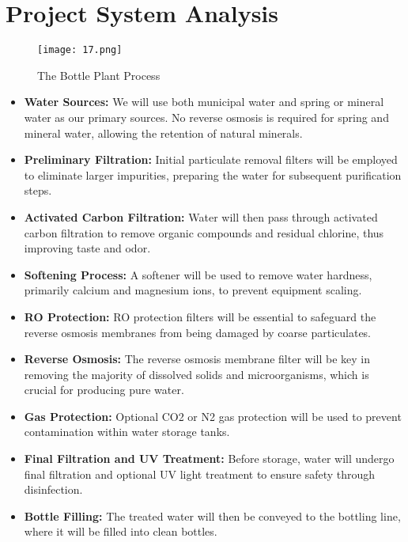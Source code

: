 \documentclass{article}
\begin{document}
\section{Project System Analysis}

\begin{figure}[H]
\centering
\texttt{[image: 17.png]}
\caption{The Bottle Plant Process}
\label{fig:unique_label_11}
\end{figure}
\begin{itemize}

\item \textbf{Water Sources:} We will use both municipal water and spring or mineral water as our primary sources. No reverse osmosis is required for spring and mineral water, allowing the retention of natural minerals.

\item \textbf{Preliminary Filtration:} Initial particulate removal filters will be employed to eliminate larger impurities, preparing the water for subsequent purification steps.

\item \textbf{Activated Carbon Filtration:} Water will then pass through activated carbon filtration to remove organic compounds and residual chlorine, thus improving taste and odor.

\item \textbf{Softening Process:} A softener will be used to remove water hardness, primarily calcium and magnesium ions, to prevent equipment scaling.

\item \textbf{RO Protection:} RO protection filters will be essential to safeguard the reverse osmosis membranes from being damaged by coarse particulates.

\item \textbf{Reverse Osmosis:} The reverse osmosis membrane filter will be key in removing the majority of dissolved solids and microorganisms, which is crucial for producing pure water.

\item \textbf{Gas Protection:} Optional CO2 or N2 gas protection will be used to prevent contamination within water storage tanks.

\item \textbf{Final Filtration and UV Treatment:} Before storage, water will undergo final filtration and optional UV light treatment to ensure safety through disinfection.

\item \textbf{Bottle Filling:} The treated water will then be conveyed to the bottling line, where it will be filled into clean bottles.


\end{itemize}
\end{document}
